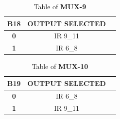 \documentclass{article}
\begin{document}
\begin{table}[htb]
\centering
\begin{tabular}{|c|c|c|}
\hline
\rowcolor[HTML]{FFFC9E} 
\textbf{B18}                      & \textbf{OUTPUT   SELECTED}      \\ \hline
{\color[HTML]{680100} \textbf{0}} & {\color[HTML]{013300} IR 9\_11} \\ \hline
{\color[HTML]{680100} \textbf{1}} & {\color[HTML]{013300} IR 6\_8}  \\ \hline
\end{tabular}
\caption{Table of \textbf{MUX-9}}
\end{table}

\begin{table}[htb]
\centering
\begin{tabular}{|c|c|c|}
\hline
\rowcolor[HTML]{FFFC9E} 
\textbf{B19}                      & \textbf{OUTPUT   SELECTED}      \\ \hline
{\color[HTML]{680100} \textbf{0}} & {\color[HTML]{013300} IR 6\_8}  \\ \hline
{\color[HTML]{680100} \textbf{1}} & {\color[HTML]{013300} IR 9\_11} \\ \hline
\end{tabular}
\caption{Table of \textbf{MUX-10}}
\end{table}

\clearpage
\end{document}
